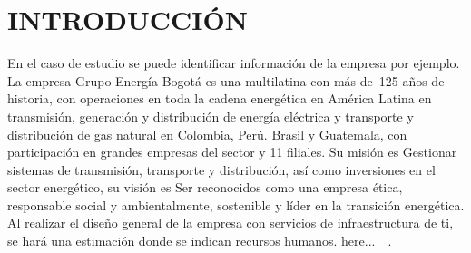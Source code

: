 \section{INTRODUCCIÓN}
\label{sec:Introduction}
En el caso de estudio se puede identificar información de la empresa por ejemplo. La empresa Grupo Energía Bogotá es una multilatina con más de 125 años de historia, con operaciones en toda la cadena energética en América Latina en transmisión, generación y distribución de energía eléctrica y transporte y distribución de gas natural en Colombia, Perú. Brasil y Guatemala, con participación en grandes empresas del sector y 11 filiales. Su misión es Gestionar sistemas de transmisión, transporte y distribución, así como inversiones en el sector energético, su visión es Ser reconocidos como una empresa ética, responsable social y ambientalmente, sostenible y líder en la transición energética. Al realizar el diseño general de la empresa con servicios de infraestructura de ti, se hará una estimación donde se indican recursos humanos. here...~\cite{Siddiqui2019}~\cite{Hagan2019}. 
